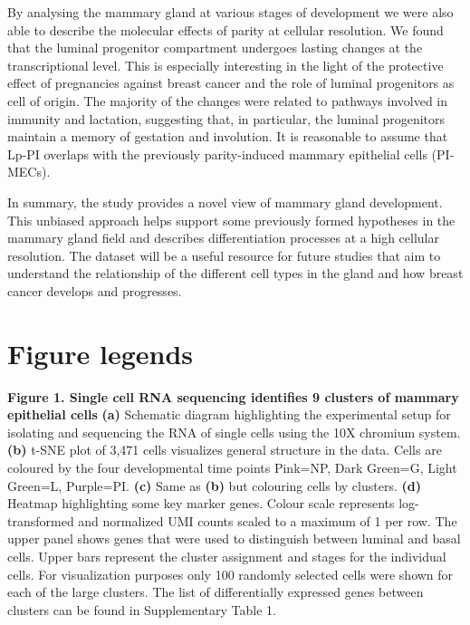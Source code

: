 \documentclass[titlepage, 12pt, oneside]{amsart}
\newcommand{\fakefigure}[1]%
{\refstepcounter{figure}\label{#1}}
\begin{document}
By analysing the mammary gland at various stages of development we were also able to describe the molecular effects of parity at cellular resolution.
We found that the luminal progenitor compartment undergoes lasting changes at the transcriptional level.
This is especially interesting in the light of the protective effect of pregnancies against breast cancer and the role of luminal progenitors as cell of origin.
The majority of the changes were related to pathways involved in immunity and lactation, suggesting that, in particular, the luminal progenitors maintain a memory of gestation and involution.
It is reasonable to assume that Lp-PI overlaps with the previously parity-induced mammary epithelial cells (PI-MECs)\autocite{Wagner2002}.

In summary, the study provides a novel view of mammary gland development.
This unbiased approach helps support some previously formed hypotheses in the mammary gland field and describes differentiation processes at a high cellular resolution.
The dataset will be a useful resource for future studies that aim to understand the relationship of the different cell types in the gland and how breast cancer develops and progresses.

\section{Figure legends}

\textbf{Figure 1. Single cell RNA sequencing identifies 9 clusters of
mammary epithelial cells }
\fakefigure{F1}
\textbf{(a)} Schematic diagram highlighting the experimental setup for isolating and sequencing the RNA of single cells using the 10X chromium system.
\textbf{(b)} t-SNE plot of 3,471 cells visualizes general structure in the data.
Cells are coloured by the four developmental time points Pink=NP, Dark Green=G, Light Green=L, Purple=PI.
\textbf{(c)} Same as \textbf{(b)} but colouring cells by clusters.
\textbf{(d)} Heatmap highlighting some key marker genes.
Colour scale represents log-transformed and normalized UMI counts scaled to a maximum of 1 per row.
The upper panel shows genes that were used to distinguish between luminal and basal cells.
Upper bars represent the cluster assignment and stages for the individual cells.
For visualization purposes only 100 randomly selected cells were shown for each of the large clusters.
The list of differentially expressed genes between clusters can be found in Supplementary Table 1.
\end{document}
